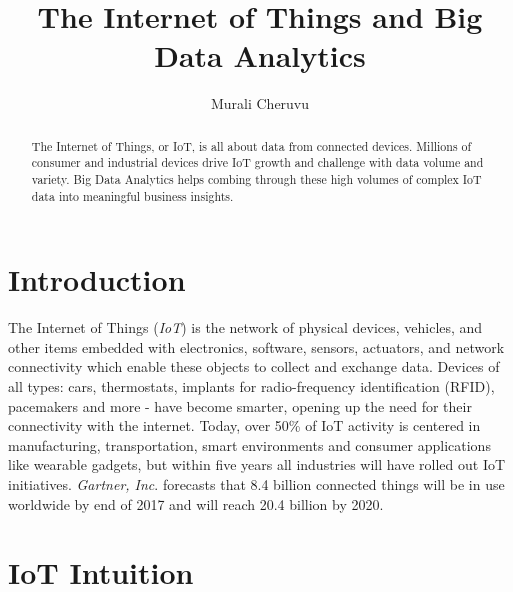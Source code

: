 \documentclass[sigconf]{acmart}
\begin{document}
	\title{The Internet of Things and Big Data Analytics}
	
	\author{Murali Cheruvu}
	
	\renewcommand{\shortauthors}{M. Cheruvu}
	
	
	\begin{abstract}
		
		The Internet of Things, or IoT, is all about data from connected devices. Millions of consumer and industrial devices drive IoT growth and challenge with data volume and variety. Big Data Analytics helps combing through these high volumes of complex IoT data into meaningful business insights.
		
	\end{abstract}
	
	
	\maketitle
	
	
	\section{Introduction}
	
	The Internet of Things ({\em IoT}) is the network of physical devices, vehicles, and other items embedded with electronics, software, sensors, actuators, and network connectivity which enable these objects to collect and exchange data. Devices of all types: cars, thermostats, implants for radio-frequency identification (RFID), pacemakers and more - have become smarter, opening up the need for their connectivity with the internet. Today, over 50\% of IoT activity is centered in manufacturing, transportation, smart environments and consumer applications like wearable gadgets, but within five years all industries will have rolled out IoT initiatives. {\em Gartner, Inc}. forecasts that 8.4 billion connected things will be in use worldwide by end of 2017 and will reach 20.4 billion by 2020\cite{gartner}. 
	
	\section{IoT Intuition}
	
\end{document}
